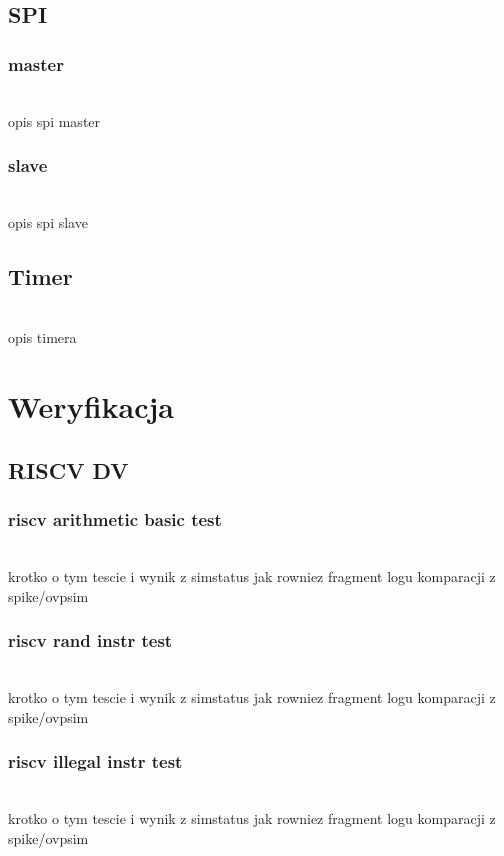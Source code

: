 \documentclass[11pt,a4paper]{article}
\begin{document}
	\subsection{SPI}
		\subsubsection{master}
		\hspace{5mm}
			\\opis spi master
		\subsubsection{slave}
		\hspace{5mm}
			\\opis spi slave

	\subsection{Timer}
	\hspace{5mm}
		\\opis timera


\newpage
\section{Weryfikacja}

	\subsection{RISCV DV}
		\subsubsection{riscv arithmetic basic test}
		\hspace{5mm}
			\\krotko o tym tescie i wynik z simstatus jak rowniez fragment logu komparacji z spike/ovpsim
			
		\subsubsection{riscv rand instr test}
		\hspace{5mm}
			\\krotko o tym tescie i wynik z simstatus jak rowniez fragment logu komparacji z spike/ovpsim
			
		\subsubsection{riscv illegal instr test}
		\hspace{5mm}
			\\krotko o tym tescie i wynik z simstatus jak rowniez fragment logu komparacji z spike/ovpsim
\end{document}
